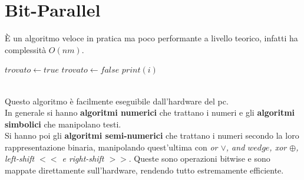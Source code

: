 \documentclass[a4paper,12pt, oneside]{book}
\begin{document}
\section{Bit-Parallel}
È un algoritmo veloce in pratica ma poco performante a livello
teorico, infatti ha complessità $O(nm)$.
\begin{algorithm}
  \State $trovato \gets true$
  \State $trovato \gets false$
  \EndIf
  \EndFor
  \State $print(i)$
  \EndIf
  \EndFor
\end{algorithm} \\
Questo algoritmo è facilmente eseguibile dall'hardware del pc. \\
In generale si hanno \textbf{algoritmi numerici} che trattano i numeri
e gli \textbf{algoritmi simbolici} che manipolano testi.\\
Si hanno poi gli\textbf{ algoritmi semi-numerici} che trattano i
numeri secondo la loro rappresentazione binaria, manipolando quest'ultima
con \textit{or $\vee$, and $wedge$, xor $\oplus$, left-shift $<<$ e
  right-shift $>>$}. Queste sono operazioni bitwise e sono
mappate direttamente sull'hardware, rendendo tutto estremamente
efficiente.\\
\end{document}
